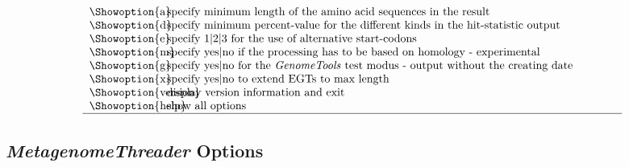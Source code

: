 \documentclass[12pt,titlepage]{article}
\newcommand{\MetagenomeThreader}{\textit{MetagenomeThreader}\xspace}
\newcommand{\GenomeTools}{\textit{GenomeTools}\xspace}
\begin{document}
\begin{table}[htbp]
\begin{footnotesize}
\[\begin{tabular}{p{2cm}p{14cm}}
\\
\Showoption{a}& specify minimum length of the amino acid sequences in the result
\\
\Showoption{d}& specify minimum percent-value for the different kinds in the hit-statistic output
\\
\Showoption{e}& specify 1$|$2$|$3 for the use of alternative start-codons
\\
\Showoption{m}& specify yes$|$no if the processing has to be based on homology - experimental
\\
\Showoption{g}& specify yes$|$no for the \GenomeTools test modus - output without the creating date
\\
\Showoption{x}& specify yes$|$no to extend EGTs to max length
\\
\Showoption{version}& display version information and exit
\\
\Showoption{help}& show all options
\\
\hline
\end{tabular}
%
\]
\end{footnotesize}
\label{overviewOpt}
\end{table}

\subsection{\MetagenomeThreader Options}
\end{document}
